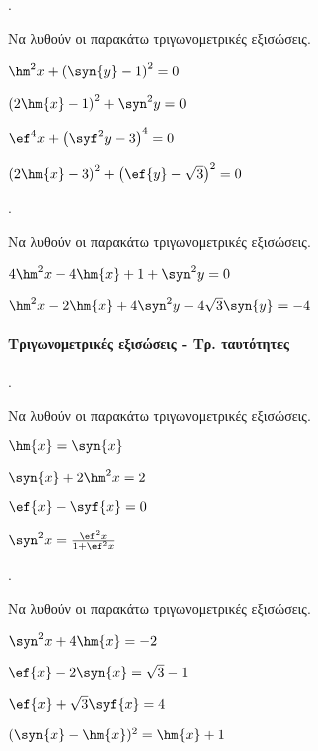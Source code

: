 \documentclass[11pt,a4paper,twocolumn]{article}
\newcounter{askhsh}
\newcommand{\askhsh}{\large\theaskhsh.\ \addtocounter{askhsh}{1}}
\begin{document}
\askhsh Να λυθούν οι παρακάτω τριγωνομετρικές εξισώσεις.
\begin{alist}
\item $ \hm^2{x}+\left(\syn{y}-1\right)^2=0 $
\item $ \left(2\hm{x}-1\right)^2+\syn^2{y}=0 $
\item $ \ef^4{x}+\left(\syf^2{y}-3\right)^4=0 $
\item $ \left(2\hm{x}-3\right)^2+\left( \ef{y}-\sqrt{3}\right)^2=0 $
\end{alist}
\askhsh Να λυθούν οι παρακάτω τριγωνομετρικές εξισώσεις.
\begin{alist}[leftmargin=4mm]
\item $ 4\hm^2{x}-4\hm{x}+1+\syn^2{y}=0 $
\item $ \hm^2{x}-2\hm{x}+4\syn^2{y}-4\sqrt{3}\syn{y}=-4 $
\end{alist}
\paragraph{Τριγωνομετρικές εξισώσεις - Τρ. ταυτότητες}
\askhsh
Να λυθούν οι παρακάτω τριγωνομετρικές εξισώσεις.
\begin{alist}
\item $ \hm{x}=\syn{x} $
\item $ \syn{x}+2\hm^2{x}=2 $
\item $ \ef{x}-\syf{x}=0 $
\item $ \syn^2{x}=\frac{\ef^2{x}}{1+\ef^2{x}} $
\end{alist}
\askhsh
Να λυθούν οι παρακάτω τριγωνομετρικές εξισώσεις.
\begin{alist}
\item $ \syn^2{x}+4\hm{x}=-2 $
\item $ \ef{x}-2\syn{x}=\sqrt{3}-1 $
\item $ \ef{x}+\sqrt{3}\syf{x}=4 $
\item $ (\syn{x}-\hm{x})^2=\hm{x}+1 $
\end{alist}
\end{document}
